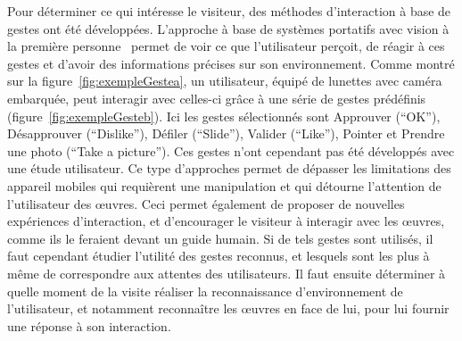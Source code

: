Pour déterminer ce qui intéresse le visiteur, des méthodes d'interaction à base de gestes ont été développées. 
L'approche à base de systèmes portatifs avec vision à la première personne~\cite{baraldi2015gesture} permet de voir ce que l'utilisateur perçoit, de réagir à ces gestes et d'avoir des informations précises sur son environnement. 
Comme montré sur la figure~\ref{fig:exempleGestea}, un utilisateur, équipé de lunettes avec caméra embarquée, peut interagir avec celles-ci grâce à une série de gestes prédéfinis (figure~\ref{fig:exempleGesteb}). 
Ici les gestes sélectionnés sont Approuver (``OK''), Désapprouver (``Dislike''), Défiler (``Slide''), Valider (``Like''), Pointer et Prendre une photo (``Take a picture'').
Ces gestes n'ont cependant pas été développés avec une étude utilisateur.
Ce type d'approches permet de dépasser les limitations des appareil mobiles qui requièrent une manipulation et qui détourne l'attention de l'utilisateur des œuvres. 
Ceci permet également de proposer de nouvelles expériences d'interaction, et d'encourager le visiteur à interagir avec les œuvres, comme ils le feraient devant un guide humain. 
Si de tels gestes sont utilisés, il faut cependant étudier l'utilité des gestes reconnus, et lesquels sont les plus à même de correspondre aux attentes des utilisateurs. 
Il faut ensuite déterminer à quelle moment de la visite réaliser la reconnaissance d'environnement de l'utilisateur, et notamment reconnaître les œuvres en face de lui, pour lui fournir une réponse à son interaction.


